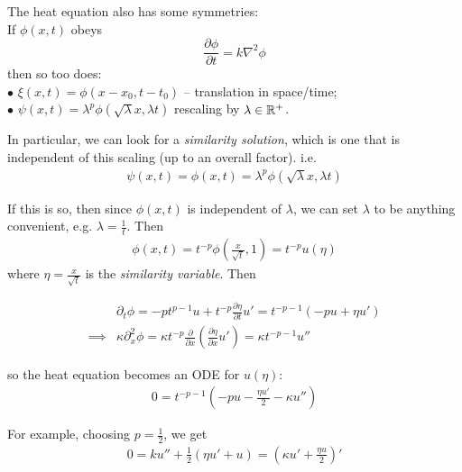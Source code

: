 \documentclass[a4paper]{article}
\begin{document}
The heat equation also has some symmetries:\\
If $\phi\left(x,t\right)$ obeys $$\frac{\partial \phi}{\partial t} = k\nabla^2 \phi$$ then so too does:\\
$\bullet$ $\xi\left(x,t\right) = \phi\left(x-x_0,t-t_0\right)$ -- translation in space/time;\\
$\bullet$ $\psi\left(x,t\right) = \lambda^p \phi\left(\sqrt{\lambda}x,\lambda t\right)$ rescaling by $\lambda \in \mathbb{R}^+$.

In particular, we can look for a \emph{similarity solution}, which is one that is independent of this scaling (up to an overall factor). i.e.
\begin{equation*}
\begin{aligned}
\psi\left(x,t\right) = \phi\left(x,t\right) = \lambda^p \phi\left(\sqrt{\lambda}x,\lambda t\right)
\end{aligned}
\end{equation*}

If this is so, then since $\phi\left(x,t\right)$ is independent of $\lambda$, we can set $\lambda$ to be anything convenient, e.g. $\lambda = \frac{1}{t}$. Then
\begin{equation*}
\begin{aligned}
\phi\left(x,t\right) = t^{-p} \phi\left(\frac{x}{\sqrt{t}},1\right) = t^{-p} u\left(\eta\right)
\end{aligned}
\end{equation*}
where $\eta = \frac{x}{\sqrt{t}}$ is the \emph{similarity variable}. Then

\begin{equation*}
\begin{aligned}
&\partial_t \phi = -pt^{p-1} u + t^{-p} \frac{\partial \eta}{\partial t} u' = t^{-p-1} \left(-pu+\eta u'\right)\\
\implies & \kappa \partial_x^2 \phi = \kappa t^{-p} \frac{\partial}{\partial x}\left(\frac{\partial \eta}{\partial x} u'\right) = \kappa t^{-p-1} u''
\end{aligned}
\end{equation*}

so the heat equation becomes an ODE for $u\left(\eta\right)$:
\begin{equation*}
\begin{aligned}
0=t^{-p-1} \left(-pu-\frac{\eta u'}{2} - \kappa u''\right)
\end{aligned}
\end{equation*}

For example, choosing $p = \frac{1}{2}$, we get
\begin{equation*}
\begin{aligned}
0 = ku'' + \frac{1}{2}\left(\eta u' + u\right) = \left(\kappa u' + \frac{\eta u}{2}\right)'
\end{aligned}
\end{equation*}
\end{document}
